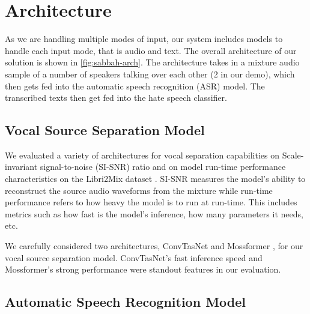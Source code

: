 \documentclass[10pt,twocolumn,letterpaper]{article}
\begin{document}

\begin{figure*}[ht]
    \centering
    
    \caption{Model Architecture of SABBAH. A multimodal system that seperates speakers within input audio files, transcribes their speeches, and classifies them. }
    \label{fig:sabbah-arch}
\end{figure*}

\section{Architecture}

As we are handling multiple modes of input,
our system includes models to handle each input mode, that is audio and text. 
The overall architecture of our solution is shown in \cref{fig:sabbah-arch}.
The architecture takes in a mixture audio sample of a number of speakers talking over each other (2 in our demo), which then gets fed into the automatic speech recognition (ASR) model. The transcribed texts then get fed into the hate speech classifier.

\subsection{Vocal Source Separation Model}
\label{sec:vocal-sep}

We evaluated a variety of architectures for vocal separation capabilities on Scale-invariant signal-to-noise (SI-SNR) ratio and on model run-time performance characteristics on the Libri2Mix dataset \cite{cosentinoLibriMixOpenSourceDataset2020}.
SI-SNR measures the model's ability to reconstruct the source audio waveforms from the mixture while run-time performance refers to how heavy the model is to run at run-time.
This includes metrics such as how fast is the model's inference, how many parameters it needs, etc. 

We carefully considered two architectures, ConvTasNet \cite{luoConvTasNetSurpassingIdeal2019} and Mossformer \cite{zhaoMossFormerPushingPerformance2023}, for our vocal source separation model. ConvTasNet's fast inference speed and Mossformer's strong performance were standout features in our evaluation.

\subsection{Automatic Speech Recognition Model}
\end{document}
